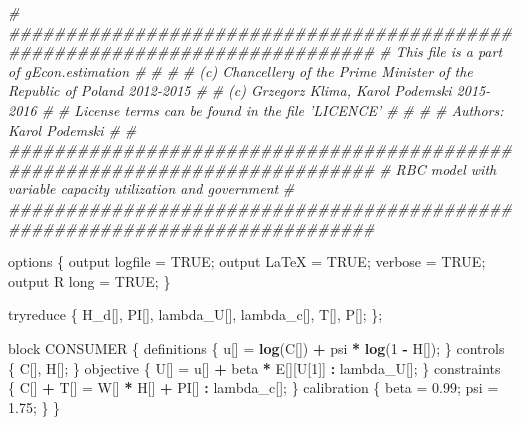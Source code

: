 \documentclass[12pt,a4paper,]{article}
\newcommand{\0}{\mathbf{0}}
\newenvironment{Shaded}{\begin{snugshade}}{\end{snugshade}}
\newcommand{\CommentTok}[1]{\textcolor[rgb]{0.56,0.35,0.01}{\textit{#1}}}
\newcommand{\DecValTok}[1]{\textcolor[rgb]{0.00,0.00,0.81}{#1}}
\newcommand{\FloatTok}[1]{\textcolor[rgb]{0.00,0.00,0.81}{#1}}
\newcommand{\KeywordTok}[1]{\textcolor[rgb]{0.13,0.29,0.53}{\textbf{#1}}}
\newcommand{\NormalTok}[1]{#1}
\newcommand{\OperatorTok}[1]{\textcolor[rgb]{0.81,0.36,0.00}{\textbf{#1}}}
\newcommand{\OtherTok}[1]{\textcolor[rgb]{0.56,0.35,0.01}{#1}}
\newcommand{\StringTok}[1]{\textcolor[rgb]{0.31,0.60,0.02}{#1}}
\begin{document}
\begin{Shaded}
\begin{Highlighting}[]
\CommentTok{# ############################################################################}
\CommentTok{# This file is a part of gEcon.estimation                                    #}
\CommentTok{#                                                                            #}
\CommentTok{# (c) Chancellery of the Prime Minister of the Republic of Poland 2012-2015  #}
\CommentTok{# (c) Grzegorz Klima, Karol Podemski 2015-2016                               #}
\CommentTok{# License terms can be found in the file 'LICENCE'                           #}
\CommentTok{#                                                                            #}
\CommentTok{# Authors: Karol Podemski                                                    #}
\CommentTok{# ############################################################################}
\CommentTok{# RBC model with variable capacity utilization and government                                                                 }
\CommentTok{# ############################################################################}


\NormalTok{options}
\NormalTok{\{}
\NormalTok{    output logfile =}\StringTok{ }\OtherTok{TRUE}\NormalTok{;}
\NormalTok{    output LaTeX =}\StringTok{ }\OtherTok{TRUE}\NormalTok{;}
\NormalTok{    verbose =}\StringTok{ }\OtherTok{TRUE}\NormalTok{;}
\NormalTok{    output R long =}\StringTok{ }\OtherTok{TRUE}\NormalTok{;}
\NormalTok{\}}

\NormalTok{tryreduce}
\NormalTok{\{}
\NormalTok{    H_d[], PI[], lambda_U[], lambda_c[], T[], P[];}
\NormalTok{\};}

\NormalTok{block CONSUMER}
\NormalTok{\{}
\NormalTok{    definitions}
\NormalTok{    \{}
\NormalTok{        u[] =}\StringTok{ }\KeywordTok{log}\NormalTok{(C[]) }\OperatorTok{+}\StringTok{ }\NormalTok{psi }\OperatorTok{*}\StringTok{ }\KeywordTok{log}\NormalTok{(}\DecValTok{1} \OperatorTok{-}\StringTok{ }\NormalTok{H[]);}
\NormalTok{    \}}
\NormalTok{    controls}
\NormalTok{    \{}
\NormalTok{        C[], H[];}
\NormalTok{    \}}
\NormalTok{    objective}
\NormalTok{    \{}
\NormalTok{        U[] =}\StringTok{ }\NormalTok{u[] }\OperatorTok{+}\StringTok{ }\NormalTok{beta }\OperatorTok{*}\StringTok{ }\NormalTok{E[][U[}\DecValTok{1}\NormalTok{]]    }\OperatorTok{:}\StringTok{ }\NormalTok{lambda_U[];}
\NormalTok{    \}}
\NormalTok{    constraints}
\NormalTok{    \{}
\NormalTok{         C[] }\OperatorTok{+}\StringTok{ }\NormalTok{T[] =}\StringTok{ }\NormalTok{W[] }\OperatorTok{*}\StringTok{ }\NormalTok{H[] }\OperatorTok{+}\StringTok{ }\NormalTok{PI[]       }\OperatorTok{:}\StringTok{ }\NormalTok{lambda_c[];}
\NormalTok{    \}}
\NormalTok{    calibration}
\NormalTok{    \{}
\NormalTok{        beta =}\StringTok{ }\FloatTok{0.99}\NormalTok{;}
\NormalTok{        psi =}\StringTok{ }\FloatTok{1.75}\NormalTok{;}
\NormalTok{    \}}
\NormalTok{\}}



\end{Highlighting}
\end{Shaded}
\end{document}
